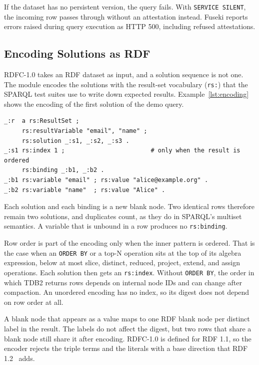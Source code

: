 \documentclass[11pt,a4paper]{article}
\newcommand{\code}[1]{\texttt{#1}}
\begin{document}
If the dataset has no persistent version, the query fails. With \code{SERVICE SILENT}, the
incoming row passes through without an attestation instead. Fuseki reports errors raised
during query execution as HTTP 500, including refused attestations.

\subsection{Encoding Solutions as RDF}
\label{sec:encoding}

RDFC-1.0 takes an RDF dataset as input, and a solution sequence is not one. The module encodes
the solutions with the result-set vocabulary (\code{rs:}) that the SPARQL test suites use to
write down expected results. Example~\ref{lst:encoding} shows the encoding of the first
solution of the demo query.

\begin{lstlisting}[language=Turtle, caption={The \code{rs:} encoding of the first solution of Example~\ref{lst:query}.}, label={lst:encoding}]
_:r  a rs:ResultSet ;
     rs:resultVariable "email", "name" ;
     rs:solution _:s1, _:s2, _:s3 .
_:s1 rs:index 1 ;                        # only when the result is ordered
     rs:binding _:b1, _:b2 .
_:b1 rs:variable "email" ; rs:value "alice@example.org" .
_:b2 rs:variable "name"  ; rs:value "Alice" .
\end{lstlisting}

Each solution and each binding is a new blank node. Two identical rows therefore remain two
solutions, and duplicates count, as they do in SPARQL's multiset semantics. A variable that is
unbound in a row produces no \code{rs:binding}.

Row order is part of the encoding only when the inner pattern is ordered. That is the case when
an \code{ORDER BY} or a top-N operation sits at the top of its algebra expression, below at most
slice, distinct, reduced, project, extend, and assign operations. Each solution then gets an
\code{rs:index}. Without \code{ORDER BY}, the order in which TDB2 returns rows depends on
internal node IDs and can change after compaction. An unordered encoding has no index, so its
digest does not depend on row order at all.

A blank node that appears as a value maps to one RDF blank node per distinct label in the
result. The labels do not affect the digest, but two rows that share a blank node still share
it after encoding. RDFC-1.0 is defined for RDF 1.1, so the encoder rejects the triple terms and
the literals with a base direction that RDF 1.2~\cite{rdf12} adds.
\end{document}
